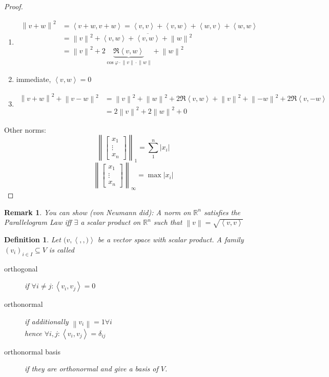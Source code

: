 \documentclass{article}
\newtheorem{definition}{Definition}  \numberwithin{definition}{section}
\newtheorem{remark}{Remark}  \numberwithin{remark}{section}
\newcommand{\ip}[2]{\left\langle#1,#2\right\rangle} %
\newcommand{\norm}[1]{\left\|#1\right\|}
\newcommand{\card}[1]{\left|#1\right|}
\begin{document}
\begin{proof}
  \begin{enumerate}
    \item 
      \begin{align*}
        \norm{v + w}^2 &= \ip{v + w}{v + w} = \ip vv + \ip vw + \ip wv + \ip ww \\
          &= \norm{v}^2 + \ip vw + \overline{\ip vw} + \norm{w}^2 \\
          &= \norm{v}^2 + 2 \underbrace{\Re\ip vw}_{\cos\varphi \cdot \norm v \cdot \norm w} + \norm{w}^2
      \end{align*}
    \item immediate, $\ip vw = 0$
    \item
      \begin{align*}
        \norm{v + w}^2 + \norm{v - w}^2 &= {\norm v}^2 + \norm{w}^2 + 2 \Re\ip vw + \norm{v}^2 + \norm{-w}^2 + 2\Re\ip v{-w} \\
          &= 2 \norm{v}^2 + 2 \norm{w}^2 + 0
      \end{align*}
  \end{enumerate}
  Other norms:
  \[ \norm{\begin{bmatrix} x_1 \\ \vdots \\ x_n \end{bmatrix}}_1 = \sum_{1}^n \card{x_i} \]
  \[ \norm{\begin{bmatrix} x_1 \\ \vdots \\ x_n \end{bmatrix}}_\infty = \max \card{x_i} \]
\end{proof}

\begin{remark} %
  You can show (von Neumann did):
  A norm on $\mathbb R^n$ satisfies the Parallelogram Law
  iff $\exists$ a scalar product on $\mathbb R^n$ such that $\norm v = \sqrt{\ip vv}$
\end{remark}

\begin{definition} %
  Let $(v, \ip ,)$ be a vector space with scalar product.
  A family $(v_i)_{i \in I} \subseteq V$ is called
  \begin{description}
    \item[orthogonal] if $\forall i \neq j: \ip{v_i}{v_j} = 0$
    \item[orthonormal] if additionally $\norm{v_i} = 1 \forall i$ \\
      hence $\forall i,j: \ip{v_i}{v_j} = \delta_{ij}$
    \item[orthonormal basis] if they are orthonormal and give a basis of $V$.
  \end{description}
\end{definition}
\end{document}
